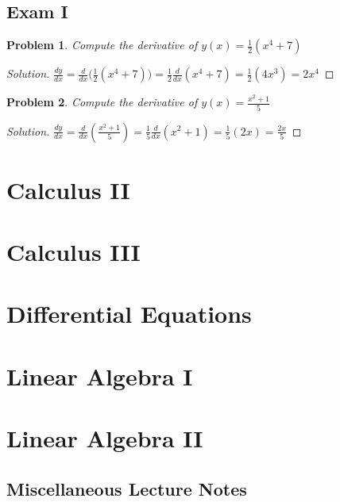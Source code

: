 \documentclass[oneside]{book}
\theoremstyle{mystyle}
\newtheorem{problem}{Problem}[section]
\begin{document}
\section{Exam I}
\begin{problem}
Compute the derivative of $y(x) = \frac{1}{2}(x^{4}+7)$
\end{problem}
\begin{proof}[Solution]
$\frac{dy}{dx} = \frac{d}{dx}\big(\frac{1}{2}(x^{4}+7)\big) = \frac{1}{2}\frac{d}{dx}(x^{4}+7) = \frac{1}{2}(4x^{3}) = 2x^{4}$
\end{proof}
\begin{problem}
Compute the derivative of $y(x)=\frac{x^{2}+1}{5}$
\end{problem}
\begin{proof}[Solution]
$\frac{dy}{dx} = \frac{d}{dx}(\frac{x^{2}+1}{5}) = \frac{1}{5}\frac{d}{dx}(x^{2}+1) = \frac{1}{5}(2x) = \frac{2x}{5}$
\end{proof}
\chapter{Calculus II}
\chapter{Calculus III}
\chapter{Differential Equations}
\chapter{Linear Algebra I}
\chapter{Linear Algebra II}
\section{Miscellaneous Lecture Notes}
\end{document}
